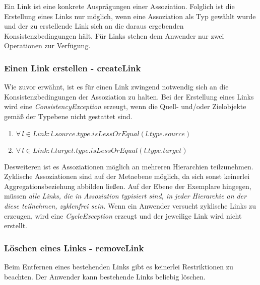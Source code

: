 Ein Link ist eine konkrete Ausprägungen einer Assoziation. 
Folglich ist die Erstellung eines Links nur möglich, wenn eine Assoziation als Typ gewählt wurde und der zu erstellende Link
sich an die  daraus ergebenden Konsistenzbedingungen hält.
Für Links stehen dem Anwender nur zwei Operationen zur Verfügung.

\subsubsection{Einen Link erstellen - createLink}
Wie zuvor erwähnt, ist es für einen Link zwingend notwendig sich an die Konsistenzbedingungen der Assoziation zu halten.
Bei der Erstellung eines Links wird eine \emph{ConsistencyException} erzeugt, wenn die Quell- und/oder Zielobjekte gemäß der Typebene nicht 
gestattet sind.

\begin{enumerate}
\item $\forall \, l \in Link: l.source.type.isLessOrEqual(l.type.source)$
\item $\forall \, l \in Link: l.target.type.isLessOrEqual(l.type.target)$
\end{enumerate}

Desweiteren ist es Assoziationen möglich an mehreren Hierarchien teilzunehmen. Zyklische Assoziationen sind auf der Metaebene möglich, 
da sich sonst keinerlei Aggregationsbeziehung abbilden ließen.
Auf der Ebene der Exemplare hingegen, müssen \emph{alle Links, die in Assoziation typisiert sind, in jeder Hierarchie an der diese teilnehmen, zyklenfrei sein.}
Wenn ein Anwender versucht zyklische Links zu erzeugen, wird eine \emph{CycleException} erzeugt und der jeweilige Link wird nicht erstellt.

\subsubsection{Löschen eines Links - removeLink}
Beim Entfernen eines bestehenden Links gibt es keinerlei Restriktionen zu beachten. Der Anwender kann bestehende Links beliebig löschen.